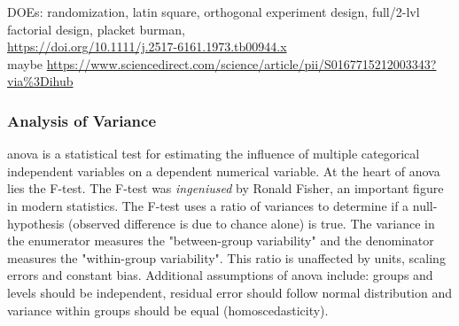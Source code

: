 DOEs: randomization, latin square, orthogonal experiment design, full/2-lvl factorial design, placket burman, \\
\url{https://doi.org/10.1111/j.2517-6161.1973.tb00944.x}\cite{whittle1973some}  \\
maybe \url{https://www.sciencedirect.com/science/article/pii/S0167715212003343?via\%3Dihub}
\fi

\subsubsection{Analysis of Variance} %
\Gls{anova} is a statistical test for estimating the influence of multiple categorical independent variables on a dependent numerical variable. 
At the heart of \gls{anova} lies the F-test. 
The F-test was \textit{ingeniused} by Ronald Fisher\cite{fisher1921on}, an important figure in modern statistics. 
The F-test uses a ratio of variances to determine if a null-hypothesis (observed difference is due to chance alone) is true. 
The variance in the enumerator measures the "between-group variability" and the denominator measures the "within-group variability".
This ratio is unaffected by units, scaling errors and constant bias. 
%
Additional assumptions of \gls{anova} include: groups and levels should be independent, 
residual error should follow normal distribution and variance within groups should be equal (homoscedasticity). 



